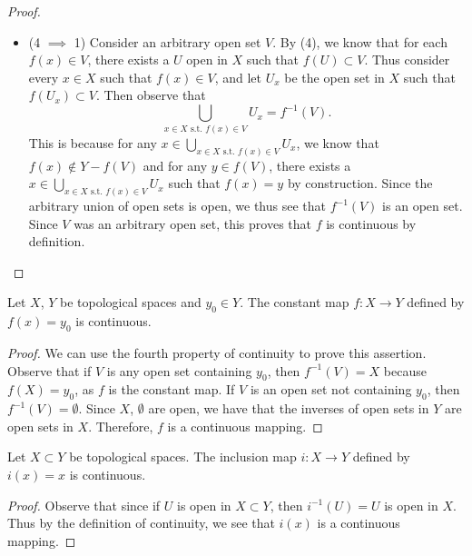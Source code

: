 \documentclass[letter,12pt,twoside]{hmcpset}
\begin{document}
\begin{proof}
\begin{itemize}
        \item (4 $\implies$ 1) Consider an arbitrary open set $V$. By (4), we know 
        that for each $f(x) \in V$, there exists a $U$ open in $X$ such that 
        $f(U) \subset V$. Thus consider every $x \in X$ such that $f(x) \in V$, 
        and let $U_x$ be the open set in $X$ such that $f(U_x) \subset V$.
        Then observe that 
        $$
        \bigcup\limits_{x \in X \text{ s.t. } f(x) \in V}U_x = f^{-1}(V).
        $$
        This is because for any $x \in \bigcup\limits_{x \in X \text{ s.t. }
        f(x) \in V}U_x$, we know that $f(x) \notin Y - f(V)$ and for any 
        $y \in f(V)$, there exists a $x \in \bigcup\limits_{x \in X \text{ s.t.
        } f(x) \in V}U_x$ such that $f(x) = y$ by construction. Since the
        arbitrary union of open sets is open, we thus see that $f^{-1}(V)$ 
        is an open set. Since $V$ was an arbitrary open set, this proves that 
        $f$ is continuous by definition.
    \end{itemize}
\end{proof}

\begin{problem}[Theorem 8.2]
    Let $X$, $Y$ be topological spaces and $y_0 \in Y$. The constant map 
    $f : X \rightarrow Y$ defined by $f(x) = y_0$ is continuous.
\end{problem}

\begin{proof}
    We can use the fourth property of continuity to prove this assertion.
    Observe that if $V$ is any open set containing $y_0$, then $f^{-1}(V) = X$
    because $f(X) = y_0$, as $f$ is the constant map. If $V$ is an open 
    set not containing $y_0$, then $f^{-1}(V) = \emptyset.$ Since $X$,
    $\emptyset$
    are open, we have that the inverses of open sets in $Y$ are open sets in
    $X$. Therefore, $f$ is a continuous mapping. 
\end{proof}

\begin{problem}[Theorem 8.3]
    Let $X \subset Y$ be topological spaces. The inclusion map $i : X
    \rightarrow Y$ defined by $i(x) = x$ is continuous.
\end{problem}

\begin{proof}
    Observe that since if $U$ is open in $X \subset Y$, then $i^{-1}(U) = U$
    is open in $X$. Thus by the definition of continuity, we see that $i(x)$ 
    is a continuous mapping.
\end{proof}
\end{document}
